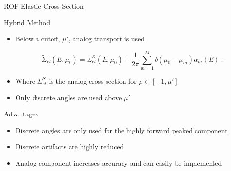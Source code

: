 \documentclass{beamer}
\begin{document}
\begin{frame}{ROP Elastic Cross Section}

\begin{block}{Hybrid Method}

  \begin{itemize}
    \item Below a cutoff, $\mu'$, analog transport is used
    
    	\begin{equation}
		\tilde{\Sigma}_{el}(E,\mu_0) 
		= \Sigma^S_{el}(E,\mu_0) + \frac{1}{2\pi}\sum_{m=1}^{M} \delta(\mu_0-\mu_m)\alpha_m(E)~.
		\label{eq:hybrid_elastic_dcs}
	\end{equation}
	
    \item Where $ \Sigma^S_{el}$ is the analog cross section for $\mu \in [-1,\mu']$
    \item Only discrete angles are used above  $\mu'$
  \end{itemize}

\end{block}

\begin{block}{Advantages}
  \begin{itemize}
    \item Discrete angles are only used for the highly forward peaked component
    \item Discrete artifacts are highly reduced
    \item Analog component increases accuracy and can easily be implemented
  \end{itemize}
\end{block}

\end{frame}

\end{document}
